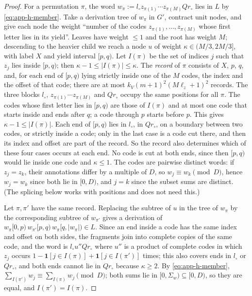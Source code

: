 \documentclass[11pt]{article}
\numberwithin{equation}{section}
\theoremstyle{plain}
\theoremstyle{definition}
\theoremstyle{remark}
\theoremstyle{plain}
\begin{document}
\begin{proof}
For a permutation $\pi$, the word $w_\pi:=l_\circ z_{\pi(1)}\cdots
z_{\pi(M)}Qr_\circ$ lies in $L$ by \eqref{eq:app-h-member}.  Take a
derivation tree of $w_\pi$ in $G'$, contract unit nodes, and give each node the
weight ``number of the codes $z_{\pi(1)},\ldots,z_{\pi(M)}$ whose first letter
lies in its yield''.  Leaves have weight $\le1$ and the root has weight $M$;
descending to the heavier child we reach a node $u$ of weight
$\kappa\in(M/3,2M/3]$, with label $X$ and yield interval $[p,q)$.  Let $I(\pi)$
be the set of indices $j$ such that $z_j$ lies inside $[p,q)$; then
$\kappa-1\le|I(\pi)|\le\kappa$.  The \emph{record} of $\pi$ consists of $X$,
$p$, $q$, and, for each end of $[p,q)$ lying strictly inside one of the $M$
codes, the index and the offset of that code; there are at most
$k_V(m+1)^2(M\ell_z+1)^2$ records.  The three blocks $l_\circ$, $z_{\pi(1)}\cdots
z_{\pi(M)}$ and $Qr_\circ$ occupy the same positions for all $\pi$.  The codes
whose first letter lies in $[p,q)$ are those of $I(\pi)$ and at most one code
that starts inside and ends after $q$; a code through $p$ starts before $p$.
This gives $\kappa-1\le|I(\pi)|$.  Each end of $[p,q)$ lies in $l_\circ$, in
$Qr_\circ$, on a boundary between two codes, or strictly inside a code; only in
the last case is a code cut there, and then its index and offset are part of the
record.  So the record also determines which of these four cases occurs at each
end.  No code is cut at both ends, since then $[p,q)$ would lie inside one code
and $\kappa\le1$.  The codes are pairwise distinct words: if $z_j=z_k$, their
annotations differ by a multiple of $D$, so $w_j\equiv w_k\pmod D$, hence
$w_j=w_k$ since both lie in $[0,D)$, and $j=k$ since the subset sums are
distinct.  (The splicing below works with positions and does not need this.)

Let $\pi,\pi'$ have the same record.  Replacing the subtree of $u$ in the tree
of $w_\pi$ by the corresponding subtree of $w_{\pi'}$ gives a derivation of
$w_\pi[0,p)\,w_{\pi'}[p,q)\,w_\pi[q,|w_\pi|)\in L$.  Since an end inside a code
has the same index and offset on both sides, the fragments join into complete
copies of the same code, and the word is $l_\circ u''Qr_\circ$ where $u''$ is a
product of complete codes in which $z_j$ occurs
$1-\mathbf 1[j\in I(\pi)]+\mathbf 1[j\in I(\pi')]$ times; this also covers ends
in $l_\circ$ or $Qr_\circ$, and both ends cannot lie in $Qr_\circ$ because
$\kappa\ge2$.  By \eqref{eq:app-h-member},
$\sum_{I(\pi')}w_j\equiv\sum_{I(\pi)}w_j\pmod D$; both sums lie in
$[0,\Sigma_w)\subseteq[0,D)$, so they are equal, and $I(\pi')=I(\pi)$.


\end{proof}
\end{document}
